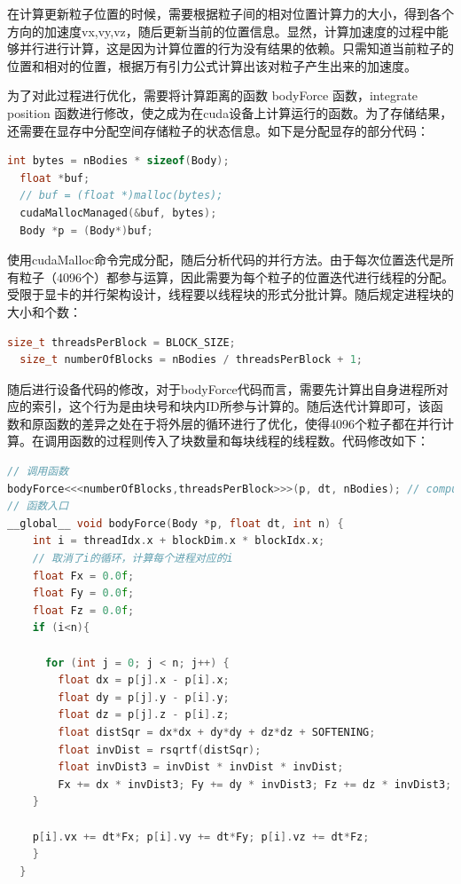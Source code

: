 \documentclass[a4paper,11pt,UTF8]{ctexart}
\begin{document}
在计算更新粒子位置的时候，需要根据粒子间的相对位置计算力的大小，得到各个方向的加速度vx,vy,vz，随后更新当前的位置信息。显然，计算加速度的过程中能够并行进行计算，这是因为计算位置的行为没有结果的依赖。只需知道当前粒子的位置和相对的位置，根据万有引力公式计算出该对粒子产生出来的加速度。

为了对此过程进行优化，需要将计算距离的函数 bodyForce 函数，integrate position 函数进行修改，使之成为在cuda设备上计算运行的函数。为了存储结果，还需要在显存中分配空间存储粒子的状态信息。如下是分配显存的部分代码：

\begin{lstlisting}[language=C++]
  int bytes = nBodies * sizeof(Body);
  float *buf;
  // buf = (float *)malloc(bytes);
  cudaMallocManaged(&buf, bytes);
  Body *p = (Body*)buf;
\end{lstlisting}

使用cudaMalloc命令完成分配，随后分析代码的并行方法。由于每次位置迭代是所有粒子（4096个）都参与运算，因此需要为每个粒子的位置迭代进行线程的分配。受限于显卡的并行架构设计，线程要以线程块的形式分批计算。随后规定进程块的大小和个数：

\begin{lstlisting}[language=C++]
  size_t threadsPerBlock = BLOCK_SIZE;
  size_t numberOfBlocks = nBodies / threadsPerBlock + 1;
\end{lstlisting}

随后进行设备代码的修改，对于bodyForce代码而言，需要先计算出自身进程所对应的索引，这个行为是由块号和块内ID所参与计算的。随后迭代计算即可，该函数和原函数的差异之处在于将外层的循环进行了优化，使得4096个粒子都在并行计算。在调用函数的过程则传入了块数量和每块线程的线程数。代码修改如下：
\begin{lstlisting}[language=C++]
// 调用函数
bodyForce<<<numberOfBlocks,threadsPerBlock>>>(p, dt, nBodies); // compute interbody forces
// 函数入口
__global__ void bodyForce(Body *p, float dt, int n) {
    int i = threadIdx.x + blockDim.x * blockIdx.x;
    // 取消了i的循环，计算每个进程对应的i
    float Fx = 0.0f;
    float Fy = 0.0f;
    float Fz = 0.0f;
    if (i<n){
      
      for (int j = 0; j < n; j++) {
        float dx = p[j].x - p[i].x;
        float dy = p[j].y - p[i].y;
        float dz = p[j].z - p[i].z;
        float distSqr = dx*dx + dy*dy + dz*dz + SOFTENING;
        float invDist = rsqrtf(distSqr);
        float invDist3 = invDist * invDist * invDist;
        Fx += dx * invDist3; Fy += dy * invDist3; Fz += dz * invDist3;
    }

    p[i].vx += dt*Fx; p[i].vy += dt*Fy; p[i].vz += dt*Fz;
    } 
  }
\end{lstlisting}
\end{document}
